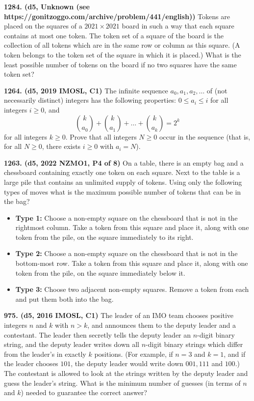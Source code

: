 \documentclass{article}
\begin{document}
        \textbf{1284. (\color{red}d5\color{black}, Unknown (see https://gonitzoggo.com/archive/problem/441/english))} Tokens are placed on the squares of a \(2021 \times 2021\) board in such a way that each square contains at most one token. The token set of a square of the board is the collection of all tokens which are in the same row or column as this square. (A token belongs to the token set of the square in which it is placed.) What is the least possible number of tokens on the board if no two squares have the same token set?

        \textbf{1264. (\color{red}d5\color{black}, 2019 IMOSL, C1)} The infinite sequence $a_0,a _1, a_2, \dots$ of (not necessarily distinct) integers has the following properties: $0\le a_i \le i$ for all integers $i\ge 0$, and \[\binom{k}{a_0} + \binom{k}{a_1} + \dots + \binom{k}{a_k} = 2^k\]for all integers $k\ge 0$. Prove that all integers $N\ge 0$ occur in the sequence (that is, for all $N\ge 0$, there exists $i\ge 0$ with $a_i=N$).

        \textbf{1263. (\color{red}d5\color{black}, 2022 NZMO1, P4 of 8)} On a table, there is an empty bag and a chessboard containing exactly one token on each square.  Next to the table is a large pile that contains an unlimited supply of tokens.  Using only the following types of moves what is the maximum possible number of tokens that can be in the bag?
        \begin{itemize}
                \item \textbf{Type 1:} Choose a non-empty square on the chessboard that is not in the rightmost column.  Take a token from this square and place it, along with one token from the pile, on the square immediately to its right.
                \item \textbf{Type 2:} Choose a non-empty square on the chessboard that is not in the bottom-most row.  Take a token from this square and place it, along with one token from the pile, on the square immediately below it.
                \item \textbf{Type 3:} Choose two adjacent non-empty squares.  Remove a token from each and put them both into the bag.
        \end{itemize}

        \textbf{975. (\color{red}d5\color{black}, 2016 IMOSL, C1)} The leader of an IMO team chooses positive integers $n$ and $k$ with $n > k$, and announces them to the deputy leader and a contestant. The leader then secretly tells the deputy leader an $n$-digit binary string, and the deputy leader writes down all $n$-digit binary strings which differ from the leader's in exactly $k$ positions. (For example, if $n = 3$ and $k = 1$, and if the leader chooses $101$, the deputy leader would write down $001, 111$ and $100$.) The contestant is allowed to look at the strings written by the deputy leader and guess the leader's string. What is the minimum number of guesses (in terms of $n$ and $k$) needed to guarantee the correct answer?
\end{document}

